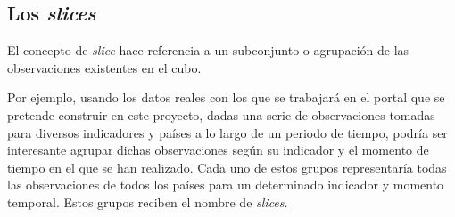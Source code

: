 \subsection{Los \textit{slices}}
El concepto de \textit{slice} hace referencia a un subconjunto o agrupación de las observaciones existentes en el cubo.

Por ejemplo, usando los datos reales con los que se trabajará en el portal que se pretende construir en este proyecto, dadas una serie de observaciones tomadas para diversos indicadores y países a lo largo de un periodo de tiempo, podría ser interesante agrupar dichas observaciones según su indicador y el momento de tiempo en el que se han realizado.  Cada uno de estos grupos representaría todas las observaciones de todos los países para un determinado indicador y momento temporal.  Estos grupos reciben el nombre de \textit{slices}.


